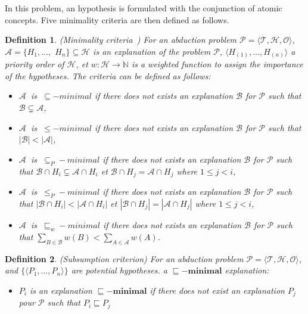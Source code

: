\documentclass{article}
\newtheorem{mydef}{Definition}
\newcommand\abs[1]{\left\lvert #1 \right\rvert}
\begin{document}
In this problem, an hypothesis is formulated with the conjunction of atomic concepts.
Five minimality criteria are then defined as follows.
\begin{mydef}{(Minimality criteria~\cite{bienvenu08complexity})}
For an abduction problem $\mathcal{P}=\langle \mathcal{T},\mathcal{H}, \mathcal{O}\rangle$,$\mathcal{A}=\{H_1,\dots,$ $H_n \} \subseteq \mathcal{H}$ is an explanation of the problem $\mathcal{P}$,
$\langle H_{(1)},\dots,H_{(n)}\rangle$ a priority order of  $\mathcal{H}$,
et $w:\mathcal{H}\rightarrow \mathbb{N}$ is a weighted function to assign the importance of the hypotheses. The criteria can be defined as follows:
\begin{itemize}
\item  $\mathcal{A}~$ is  $~\subseteq -minimal$ if there does not exists an explanation $\mathcal{B}$ for $\mathcal{P}$ such that $\mathcal{B} \subsetneq \mathcal{A}$,
\item  $\mathcal{A}~$ is  $~\leq -minimal$ if there does not exists an explanation $\mathcal{B}$ for $\mathcal{P}$ such that $\abs{\mathcal{B}} < \abs{\mathcal{A}}$,
\item  $\mathcal{A}~$ is  $~\subseteq_P -minimal$ if there does not exists an explanation $\mathcal{B}$ for $\mathcal{P}$ such that $\mathcal{B} \cap H_i \subsetneq \mathcal{A}\cap H_i$ et
$\mathcal{B} \cap H_j = \mathcal{A}\cap H_j$ where $1\leq j< i$,
\item  $\mathcal{A}~$ is  $~\leq_P -minimal$ if there does not exists an explanation $\mathcal{B}$ for $\mathcal{P}$ such that $\abs{\mathcal{B} \cap H_i} < \abs{\mathcal{A}\cap H_i}$ et
$\abs{\mathcal{B} \cap H_j} = \abs{\mathcal{A}\cap H_j}$ where $1\leq j< i$,
\item  $\mathcal{A}~$ is  $~\sqsubseteq_w -minimal$ if there does not exists an explanation $\mathcal{B}$ for $\mathcal{P}$ such that $\sum_{B \in \mathcal{B}}w(B) < \sum_{A \in \mathcal{A}}w(A)$.
\end{itemize}
 \end{mydef}

 \begin{mydef}{(Subsumption criterion)}
For an abduction problem $\mathcal{P}=\langle \mathcal{T},\mathcal{H}, \mathcal{O}\rangle$, and $\{\langle P_{1},\dots,P_{n}\rangle\}$ are potential hypotheses. 
a $\bm{\sqsubseteq -minimal}$ explanation:
\begin{itemize}
\item  $P_{i}$ is an explanation $\bm{\sqsubseteq -minimal}$ if there does not exist an explanation $P_{j}$ pour $\mathcal{P}$ such that $P_{i}\sqsubseteq P_{j}$
\end{itemize}
\end{mydef}
\end{document}
